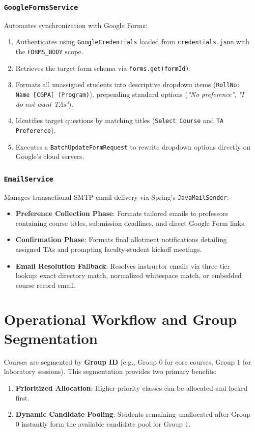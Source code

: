 \documentclass[12pt, a4paper]{article}
\begin{document}
\subsubsection{\texttt{GoogleFormsService}}
Automates synchronization with Google Forms:
\begin{enumerate}[noitemsep]
    \item Authenticates using \texttt{GoogleCredentials} loaded from \texttt{credentials.json} with the \texttt{FORMS\_BODY} scope.
    \item Retrieves the target form schema via \texttt{forms.get(formId)}.
    \item Formats all unassigned students into descriptive dropdown items (\texttt{RollNo: Name [CGPA] (Program)}), prepending standard options (\textit{"No preference"}, \textit{"I do not want TAs"}).
    \item Identifies target questions by matching titles (\texttt{Select Course} and \texttt{TA Preference}).
    \item Executes a \texttt{BatchUpdateFormRequest} to rewrite dropdown options directly on Google's cloud servers.
\end{enumerate}

\subsubsection{\texttt{EmailService}}
Manages transactional SMTP email delivery via Spring's \texttt{JavaMailSender}:
\begin{itemize}[noitemsep]
    \item \textbf{Preference Collection Phase}: Formats tailored emails to professors containing course titles, submission deadlines, and direct Google Form links.
    \item \textbf{Confirmation Phase}: Formats final allotment notifications detailing assigned TAs and prompting faculty-student kickoff meetings.
    \item \textbf{Email Resolution Fallback}: Resolves instructor emails via three-tier lookup: exact directory match, normalized whitespace match, or embedded course record email.
\end{itemize}

\section{Operational Workflow and Group Segmentation}
Courses are segmented by \textbf{Group ID} (e.g., Group 0 for core courses, Group 1 for laboratory sessions). This segmentation provides two primary benefits:
\begin{enumerate}
    \item \textbf{Prioritized Allocation}: Higher-priority classes can be allocated and locked first.
    \item \textbf{Dynamic Candidate Pooling}: Students remaining unallocated after Group 0 instantly form the available candidate pool for Group 1.
\end{enumerate}
\end{document}
